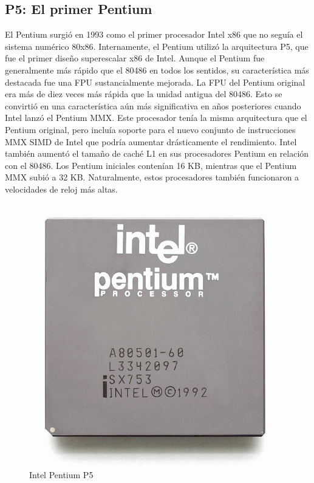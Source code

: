 \subsection{P5: El primer Pentium}
El Pentium surgió en 1993 como el primer procesador Intel x86 que no seguía el sistema numérico 80x86. Internamente, el Pentium utilizó la arquitectura P5, que fue el 
primer diseño superescalar x86 de Intel. Aunque el Pentium fue generalmente más rápido que el 80486 en todos los sentidos, su característica más destacada fue una FPU 
sustancialmente mejorada. La FPU del Pentium original era más de diez veces más rápida que la unidad antigua del 80486. Esto se convirtió en una característica aún más 
significativa en años posteriores cuando Intel lanzó el Pentium MMX. Este procesador tenía la misma arquitectura que el Pentium original, pero incluía soporte para el 
nuevo conjunto de instrucciones MMX SIMD de Intel que podría aumentar drásticamente el rendimiento. Intel también aumentó el tamaño de caché L1 en sus procesadores Pentium 
en relación con el 80486. Los Pentium iniciales contenían 16 KB, mientras que el Pentium MMX subió a 32 KB. Naturalmente, estos procesadores también funcionaron a 
velocidades de reloj más altas.
\begin{figure}[htb]
	\centering
	\includegraphics[scale = 0.15]{Graphics/Intel_Pentium_P5.jpg}
	\caption{Intel Pentium P5}
	\label{fig:22}
\end{figure}

